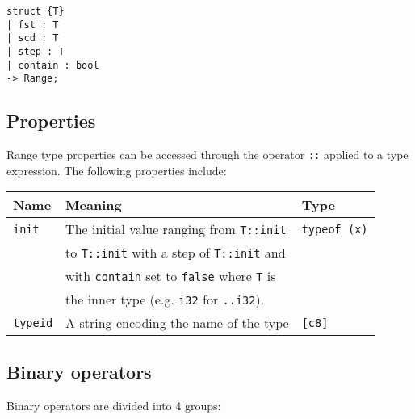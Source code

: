 \begin{lstlisting}[style=coloredverbatim]
struct {T}
| fst : T
| scd : T
| step : T
| contain : bool
-> Range;
\end{lstlisting}

\subsection {Properties}

Range type properties can be accessed through the operator \texttt{::} applied
to a type expression. The following properties include:

\begin{center}\begin{adjustbox}{max width=\linewidth}
  \begin{tabular}{|l|ll|}
    \hline
    Name & Meaning & Type\\
    \hline
    \hline
    \texttt{init} & The initial value ranging from \texttt{T::init} & \texttt{typeof (x)}\\
    & to \texttt{T::init} with a step of \texttt{T::init} and & \\
    & with \texttt{contain} set to \texttt{false} where \texttt{T} is & \\
    & the inner type (e.g. \texttt{i32} for \texttt{..i32}). &\\
    \hline
    \texttt{typeid} & A string encoding the name of the type & \texttt{[c8]} \\
    \hline
  \end{tabular}
\end{adjustbox}\end{center}


\subsection {Binary operators}

Binary operators are divided into 4 groups:

